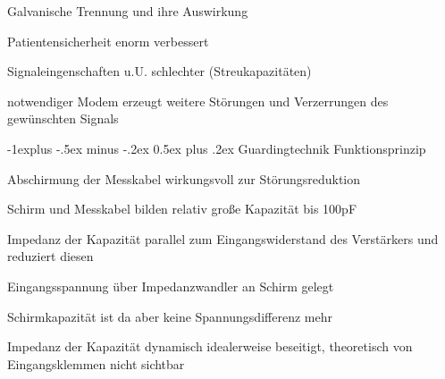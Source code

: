 \documentclass[a4paper]{article}
\makeatletter
\renewcommand{\subsection}{\@startsection{subsection}{2}{0mm}%
 {-1explus -.5ex minus -.2ex}%
 {0.5ex plus .2ex}%
 {\normalfont\normalsize\bfseries}}
\makeatother
\begin{document}
\begin{multicols}{3}
  Galvanische Trennung und ihre Auswirkung
  \begin{itemize*}
    \item Patientensicherheit enorm verbessert
    \item Signaleingenschaften u.U. schlechter (Streukapazitäten)
    \item notwendiger Modem erzeugt weitere Störungen und Verzerrungen des gewünschten Signals
  \end{itemize*}

  \subsection{Guardingtechnik}\label{guardingtechnik}
  Funktionsprinzip
  \begin{itemize*}
    \item Abschirmung der Messkabel wirkungsvoll zur Störungsreduktion
    \item Schirm und Messkabel bilden relativ große Kapazität bis 100pF
    \item Impedanz der Kapazität parallel zum Eingangswiderstand des Verstärkers und reduziert diesen %
    \item Eingangsspannung über Impedanzwandler an Schirm gelegt
    \item Schirmkapazität ist da aber keine Spannungsdifferenz mehr %
    \item Impedanz der Kapazität dynamisch idealerweise beseitigt, theoretisch von Eingangsklemmen nicht sichtbar %
  \end{itemize*}


\end{multicols}
\end{document}
